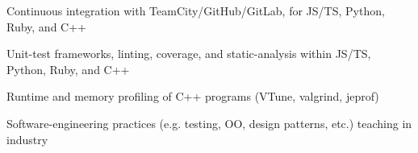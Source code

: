 \begin{plainlist}
	\item Continuous integration with TeamCity/GitHub/GitLab, for JS/TS, Python, Ruby, and C++
	\item Unit-test frameworks, linting, coverage, and static-analysis within JS/TS, Python, Ruby, and C++
	\item Runtime and memory profiling of C++ programs (VTune, valgrind, jeprof)
	\item Software-engineering practices (e.g. testing, OO, design patterns, etc.) teaching in industry
\end{plainlist}
